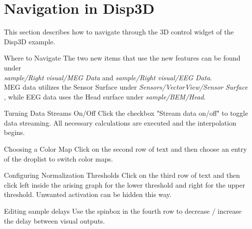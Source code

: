 \section{Navigation in Disp3D}

This section describes how to navigate through the 3D control widget of the Disp3D example.

\begin{aims}
	\item[\hspace*{10mm} Where to Navigate] The two new items that use the new features can be found under\\ \textit{sample/Right visual/MEG Data}  and \textit{sample/Right visual/EEG Data}.  \\ 
	MEG data utilizes the Sensor Surface under \textit{Sensors/VectorView/Sensor Surface} , while EEG data uses the Head surface under \textit{sample/BEM/Head}.  
\end{aims}
	
	
\begin{aims}
	\item[\hspace*{10mm} Turning Data Streams On/Off] Click the checkbox "Stream data on/off" to toggle data streaming. All necessary calculations are executed and the interpolation begins. 
\end{aims}

\begin{aims}
	\item[\hspace*{10mm} Choosing a Color Map] Click on the second row of text and then choose an entry of the droplist to switch color maps. 
\end{aims}

\begin{aims}
	\item[\hspace*{10mm} Configuring Normalization Thresholds] Click on the third row of text and then click left inside the arising graph for the lower threshold and right for the upper threshold. 
	Unwanted activation can be hidden this way. 
\end{aims}

\begin{aims}
	\item[\hspace*{10mm} Editing sample delays] Use the spinbox in the fourth row to decrease / increase the delay between visual outputs. 
\end{aims}

